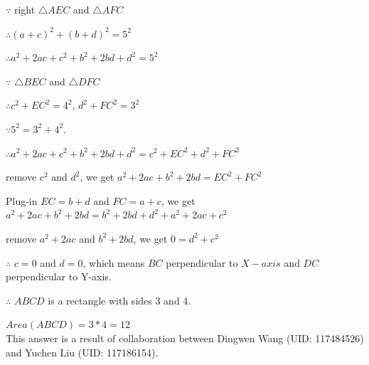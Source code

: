 \documentclass[letter,12pt]{article}
\begin{document}
$\because$ right $\triangle AEC$ and $\triangle AFC$

$\therefore (a+c)^2 + (b+d)^2 = 5^2$ 

$\therefore a^2 + 2ac + c^2 + b^2 + 2bd + d^2 = 5^2$

$\because$ $\triangle BEC$ and $\triangle DFC$

$\therefore c^2 + EC^2 = 4^2$, $d^2 + FC^2 = 3^2$

$\because 5^2 = 3^2 + 4^2$.

$\therefore a^2 + 2ac + c^2 + b^2 + 2bd + d^2 = c^2 + EC^2 + d^2 + FC^2$

remove $c^2$ and $d^2$, we get $a^2 + 2ac + b^2 + 2bd = EC^2 + FC^2$

Plug-in $EC = b + d$ and $FC = a + c$, we get $a^2 + 2ac + b^2 + 2bd = b^2 + 2bd + d^2 + a^2 + 2ac + c^2$

remove $a^2 + 2ac$ and $b^2 + 2bd$, we get $0 = d^2 + c^2$

$\therefore$ $c = 0$ and $d = 0$, which means $BC$ perpendicular to $X-axis$ and $DC$ perpendicular to Y-axis.

$\therefore$ $ABCD$ is a rectangle with sides 3 and 4.

$Area(ABCD) = 3 * 4 = 12$\\

This answer is a result of collaboration between Dingwen Wang (UID: 117484526) and Yuchen Liu (UID: 117186154).

\pagebreak
\end{document}
